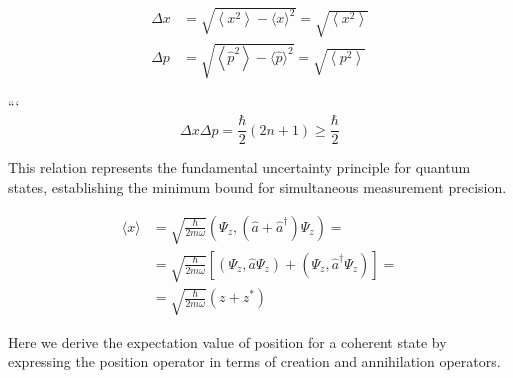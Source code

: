 \documentclass[10pt]{article}
\begin{document}
\begin{align*}
\Delta x & =\sqrt{\left\langle x^{2}\right\rangle-\langle x\rangle^{2}}=\sqrt{\left\langle x^{2}\right\rangle} \\
\Delta p & =\sqrt{\left\langle\hat{p}^{2}\right\rangle-\langle\hat{p}\rangle^{2}}=\sqrt{\left\langle p^{2}\right\rangle} \tag{7.68}
\end{align*}

```
\begin{equation*}
\Delta x \Delta p=\frac{\hbar}{2}(2 n+1) \geq \frac{\hbar}{2} \tag{7.69}
\end{equation*}

This relation represents the fundamental uncertainty principle for quantum states, establishing the minimum bound for simultaneous measurement precision.

\begin{align*}
\langle x\rangle & =\sqrt{\frac{\hbar}{2 m \omega}}\left(\Psi_{z},\left(\hat{a}+\hat{a}^{\dagger}\right) \Psi_{z}\right)= \\
& =\sqrt{\frac{\hbar}{2 m \omega}}\left[\left(\Psi_{z}, \hat{a} \Psi_{z}\right)+\left(\Psi_{z}, \hat{a}^{\dagger} \Psi_{z}\right)\right]=  \tag{7.70}\\
& =\sqrt{\frac{\hbar}{2 m \omega}}\left(z+z^{*}\right)
\end{align*}

Here we derive the expectation value of position for a coherent state by expressing the position operator in terms of creation and annihilation operators.
\end{document}
